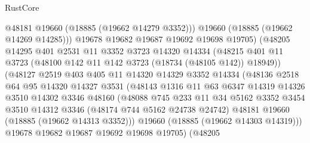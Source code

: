\begin{lexlean}{RustCore}
\begin{coremodule}
                          @48181
                          @19660
                          (@18885 (@19662 @14279 @3352)))
                        @19660
                        (@18885 (@19662 @14269 @14285)))
                      @19678
                      @19682
                      @19687
                      @19692
                      @19698
                      @19705)
                    (@48205
                      @14295
                      @401
                      @2531
                      @11
                      @3352
                      @3723
                      @14320
                      @14334
                      (@48215
                        @401
                        @11
                        @3723
                        (@48100 @142 @11 @142 @3723 (@18734 (@48105 @142)) @18949))
                      (@48127
                        @2519
                        @403
                        @405
                        @11
                        @14320
                        @14329
                        @3352
                        @14334
                        (@48136
                          @2518
                          @64
                          @95
                          @14320
                          @14327
                          @3531
                          (@48143
                            @1316
                            @11
                            @63
                            @6347
                            @14319
                            @14326
                            @3510
                            @14302
                            @3346
                            @48160
                            (@48088
                              @745
                              @233
                              @11
                              @34
                              @5162
                              @3352
                              @3454
                              @3510
                              @14312
                              @3346
                              (@48174 @744 @5162 @24738 @24742)
                              @48181
                              @19660
                              (@18885 (@19662 @14313 @3352)))
                            @19660
                            (@18885 (@19662 @14303 @14319)))
                          @19678
                          @19682
                          @19687
                          @19692
                          @19698
                          @19705)
                        (@48205

\end{coremodule}
\end{lexlean}

